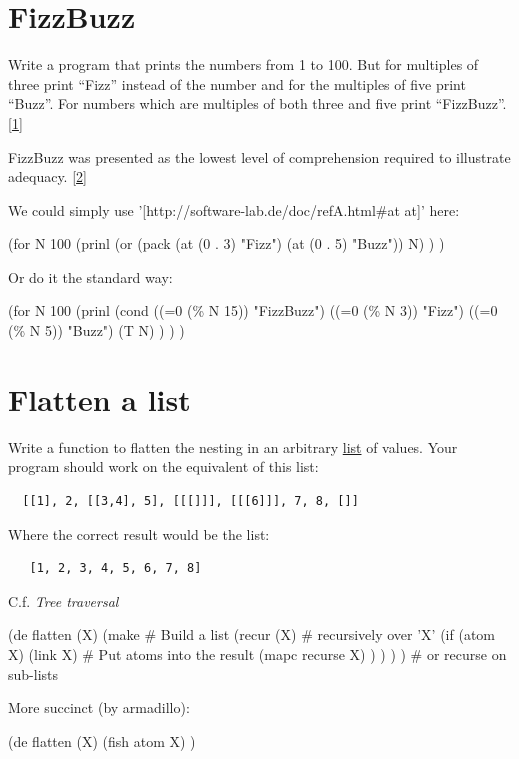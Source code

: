 \pagebreak{}
\section*{FizzBuzz}

Write a program that prints the numbers from 1 to 100. But for multiples
of three print ``Fizz'' instead of the number and for the multiples of
five print ``Buzz''. For numbers which are multiples of both three and
five print ``FizzBuzz''.
\href{http://weblog.raganwald.com/2007/01/dont-overthink-fizzbuzz.html}{{[}1{]}}

FizzBuzz was presented as the lowest level of comprehension required to
illustrate adequacy.
\href{http://www.codinghorror.com/blog/archives/000804.html}{{[}2{]}}


\begin{wideverbatim}

We could simply use '[http://software-lab.de/doc/refA.html#at at]' here:

(for N 100
   (prinl
      (or (pack (at (0 . 3) "Fizz") (at (0 . 5) "Buzz")) N) ) )

Or do it the standard way:

(for N 100
   (prinl
      (cond
         ((=0 (\% N 15)) "FizzBuzz")
         ((=0 (\% N 3)) "Fizz")
         ((=0 (\% N 5)) "Buzz")
         (T N) ) ) )

\end{wideverbatim}

\pagebreak{}
\section*{Flatten a list}

Write a function to flatten the nesting in an arbitrary
\href{http://en.wikipedia.org/wiki/List\_(computing)}{list} of values.
Your program should work on the equivalent of this list:

\begin{verbatim}
  [[1], 2, [[3,4], 5], [[[]]], [[[6]]], 7, 8, []]
\end{verbatim}

Where the correct result would be the list:

\begin{verbatim}
   [1, 2, 3, 4, 5, 6, 7, 8]
\end{verbatim}

C.f. \emph{Tree traversal}


\begin{wideverbatim}

(de flatten (X)
   (make                               # Build a list
      (recur (X)                       # recursively over 'X'
         (if (atom X)
            (link X)                   # Put atoms into the result
            (mapc recurse X) ) ) ) )   # or recurse on sub-lists

More succinct (by armadillo):

(de flatten (X)
   (fish atom X) )

\end{wideverbatim}


